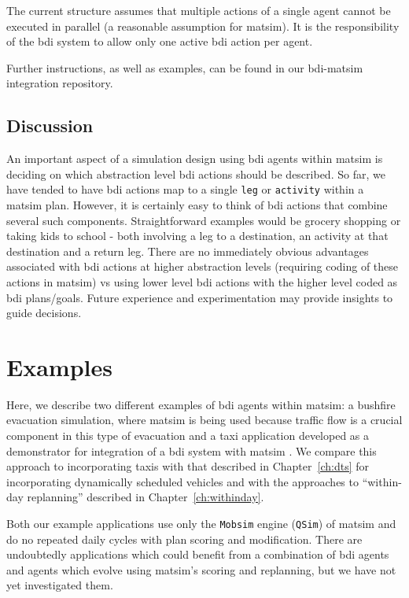 The current structure assumes that multiple actions of a single agent
cannot be executed in parallel (a reasonable assumption for
\gls{matsim}). It is the responsibility of the \gls{bdi} system to allow only
one active \gls{bdi} action per agent.

Further instructions, as well as examples, can be found in our
\gls{bdi}-\gls{matsim} integration repository.

\subsection{Discussion}
An important aspect of a simulation design using \gls{bdi} agents
within \gls{matsim} is deciding on which abstraction level \gls{bdi}
actions should be described. So far, we have tended to have \gls{bdi}
actions map to a single \lstinline{leg} or \lstinline{activity} within a
\gls{matsim} plan. However, it is certainly easy to think of \gls{bdi} actions
that combine several such components. Straightforward examples would
be grocery shopping or taking kids to school - both involving a
leg to a destination, an activity at that destination and a return
leg. There are no immediately obvious advantages associated with \gls{bdi}
actions at higher abstraction levels (requiring coding of these
actions in \gls{matsim}) vs using lower level \gls{bdi} actions with the higher
level coded as \gls{bdi} plans/goals. Future experience and experimentation
may provide insights to guide decisions.

\section{Examples}
\label{sec:bid-examples}
Here, we describe two different examples of \gls{bdi} agents within
\gls{matsim}: a bushfire evacuation simulation, where \gls{matsim} is
being used because traffic flow is a crucial component in this type of
evacuation and a taxi application developed as a
demonstrator for integration of a \gls{bdi} system with \gls{matsim} \citep{ecai}. We 
compare this approach to incorporating taxis with that
described in Chapter~\ref{ch:dts} for
incorporating dynamically scheduled vehicles and with the approaches
to ``within-day replanning'' described in Chapter~\ref{ch:withinday}.

%
Both our example applications use only the \lstinline{Mobsim} engine
(\lstinline{QSim}) of \gls{matsim} and do no repeated daily cycles
with plan scoring and modification. There are undoubtedly applications which
could benefit from a combination of \gls{bdi} agents and agents which evolve using
\gls{matsim}'s scoring and replanning, but we have not yet investigated them.

